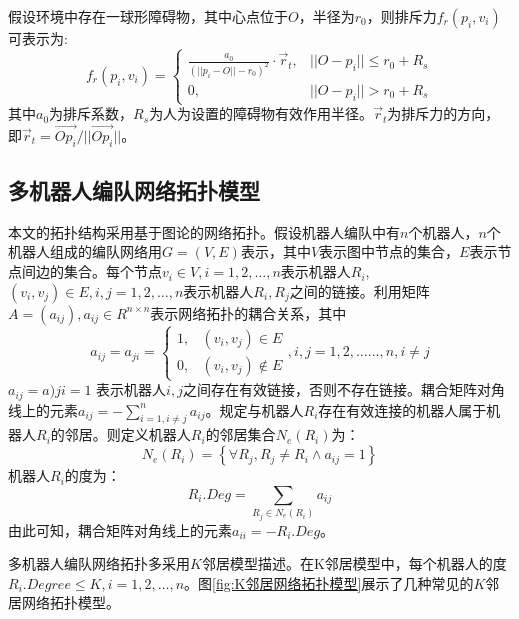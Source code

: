 假设环境中存在一球形障碍物，其中心点位于$O$，半径为$r_0$，则排斥力$f_r(p_i,v_i)$可表示为:\\
\begin{equation}
	f_r(p_i,v_i) = \begin{cases}
		\frac{a_0}{{(\lvert\lvert p_i-O \rvert\rvert -r_0)}^2} \cdot \vec{r}_t, & \lvert\lvert O-p_i \rvert\rvert \leq r_0 + R_s \\
		0, &  \lvert\lvert O-p_i \rvert\rvert > r_0 + R_s
	\end{cases}
\end{equation}
其中$a_0$为排斥系数，$R_s$为人为设置的障碍物有效作用半径。$\vec{r}_t$为排斥力的方向，即$\vec{r}_t = \vec{Op_i}/\lvert\lvert\vec{Op_i}\rvert\rvert$。

\subsection{多机器人编队网络拓扑模型}
本文的拓扑结构采用基于图论的网络拓扑。假设机器人编队中有$n$个机器人，$n$个机器人组成的编队网络用$G=(V,E)$表示，其中$V$表示图中节点的集合，$E$表示节点间边的集合。每个节点$v_i\in V, i=1,2,\dots,n$表示机器人$R_i$, $(v_i,v_j)\in E, i,j=1,2,\dots,n$表示机器人$R_i,R_j$之间的链接。利用矩阵$A=(a_{ij}),a_{ij} \in R^{n \times n}$表示网络拓扑的耦合关系，其中\\
\begin{equation}
	a_{ij}=a_{ji} =
	\begin{cases}
		1, & (v_i,v_j) \in E \\
		0, & (v_i,v_j) \notin E
	\end{cases}
	, i,j = 1,2,\dots\dots,n, i \neq j
\end{equation}
$a_{ij} = a){ji} = 1$ 表示机器人$i,j$之间存在有效链接，否则不存在链接。耦合矩阵对角线上的元素$a_{ij} = -\sum_{i=1,i \neq j}^n a_{ij}$。规定与机器人$R_i$存在有效连接的机器人属于机器人$R_i$的邻居。则定义机器人$R_i$的邻居集合$N_e(R_i)$为：\\
\begin{equation}
	N_e(R_i) = \left\{ \forall R_j, R_j \neq R_i \wedge a_{ij}=1 \right\}
\end{equation}
机器人$R_i$的度为：\\
\begin{equation}
	R_i.Deg = \sum_{R_j \in N_e(R_i)} a_{ij}
\end{equation}
由此可知，耦合矩阵对角线上的元素$a_{ii} = -R_i.Deg$。

多机器人编队网络拓扑多采用$K$邻居模型\supercite{xue2004number}描述。在K邻居模型中，每个机器人的度$R_i.Degree \leq K, i=1,2, \dots ,n$。图\ref{fig:K邻居网络拓扑模型}展示了几种常见的$K$邻居网络拓扑模型。

